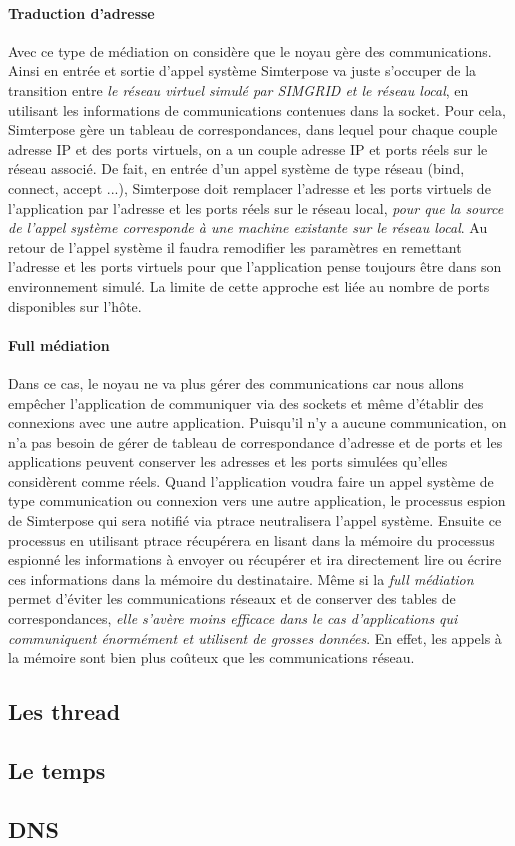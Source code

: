 \paragraph{Traduction d'adresse}
 Avec ce type de médiation on considère que le noyau gère des
 communications. Ainsi en entrée et sortie d'appel système Simterpose va juste
 s'occuper de la transition entre \textit{le réseau virtuel simulé par SIMGRID
   et le réseau local}, en utilisant les informations de communications
 contenues dans la socket. Pour cela, Simterpose gère un tableau de
 correspondances, dans lequel pour chaque couple adresse IP et des ports
 virtuels, on a un couple adresse IP et ports réels sur le réseau associé.  De
 fait, en entrée d'un appel système de type réseau (bind, connect, accept ...),
 Simterpose doit remplacer l'adresse et les ports virtuels de l'application par
 l'adresse et les ports réels sur le réseau local, \textit{pour que la source de
   l'appel système corresponde à une machine existante sur le réseau local}. Au
 retour de l'appel système il faudra remodifier les paramètres en remettant
 l'adresse et les ports virtuels pour que l'application pense toujours être dans
 son environnement simulé.  La limite de cette approche est liée au nombre de
 ports disponibles sur l'hôte.

\paragraph{Full médiation} 
Dans ce cas, le noyau ne va plus gérer des communications car nous allons
empêcher l'application de communiquer via des sockets et même d'établir des
connexions avec une autre application.  Puisqu'il n'y a aucune communication, on
n'a pas besoin de gérer de tableau de correspondance d'adresse et de ports et
les applications peuvent conserver les adresses et les ports simulées qu'elles
considèrent comme réels. Quand l'application voudra faire un appel système de
type communication ou connexion vers une autre application, le processus espion
de Simterpose qui sera notifié via ptrace neutralisera l'appel système. Ensuite
ce processus en utilisant ptrace récupérera en lisant dans la mémoire du
processus espionné les informations à envoyer ou récupérer et ira directement
lire ou écrire ces informations dans la mémoire du destinataire.  Même si la
\textit{full médiation} permet d'éviter les communications réseaux et de
conserver des tables de correspondances, \textit{elle s'avère moins efficace
  dans le cas d'applications qui communiquent énormément et utilisent de grosses
  données}. En effet, les appels à la mémoire sont bien plus coûteux que les
communications réseau.

\subsection{Les thread}

\subsection{Le temps}

\subsection{DNS}
